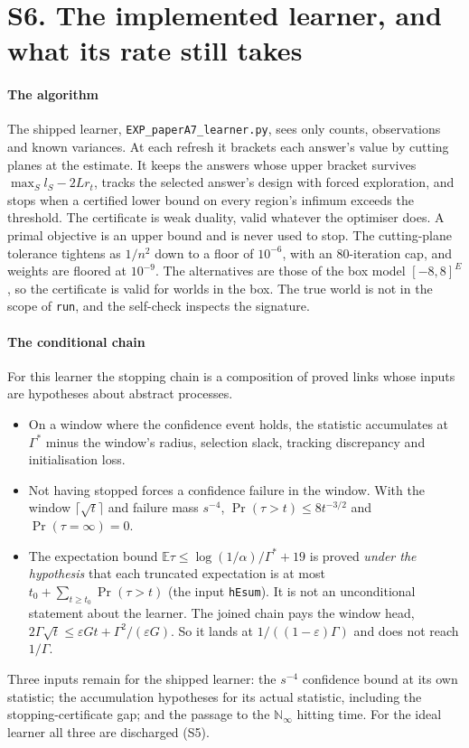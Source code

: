 
\section{S6. The implemented learner, and what its rate still takes}

\paragraph{The algorithm} The shipped learner, \texttt{EXP\_paperA7\_learner.py}, sees only
counts, observations and known variances. At each refresh it brackets each answer's value by
cutting planes at the estimate. It keeps the answers whose upper bracket survives
$\max_{S}l_{S}-2Lr_{t}$, tracks the selected answer's design with forced exploration, and stops
when a certified lower bound on every region's infimum exceeds the threshold. The certificate is
weak duality, valid whatever the optimiser does. A primal objective is an upper bound and is
never used to stop. The cutting-plane tolerance tightens as $1/n^{2}$ down to a floor of
$10^{-6}$, with an 80-iteration cap, and weights are floored at $10^{-9}$. The alternatives are
those of the box model $[-8,8]^E$, so the certificate is valid for worlds in the box. The true
world is not in the scope of \texttt{run}, and the
self-check inspects the signature.

\paragraph{The conditional chain} For this learner the stopping chain is a composition of proved
links whose inputs are hypotheses about abstract processes.
\begin{itemize}
\item On a window where the confidence event holds, the statistic accumulates at
$\Gamma^{*}$ minus the window's radius, selection slack, tracking discrepancy and
initialisation loss.
\item Not having stopped forces a confidence failure in the window. With the window
$\lceil\sqrt t\rceil$ and failure mass $s^{-4}$, $\Pr(\tau>t)\le8t^{-3/2}$ and
$\Pr(\tau=\infty)=0$.
\item The expectation bound $\mathbb{E}\tau\le\log(1/\alpha)/\Gamma^{*}+19$ is proved
\emph{under the hypothesis} that each truncated expectation is at most
$t_{0}+\sum_{t\ge t_{0}}\Pr(\tau>t)$ (the input \texttt{hEsum}). It is not an unconditional
statement about the learner. The joined chain pays the window head,
$2\Gamma\sqrt t\le\varepsilon Gt+\Gamma^{2}/(\varepsilon G)$. So it lands at
$1/((1-\varepsilon)\Gamma)$ and does not reach $1/\Gamma$.
\end{itemize}
Three inputs remain for the shipped learner: the $s^{-4}$ confidence bound at its own
statistic; the accumulation hypotheses for its actual statistic, including the
stopping-certificate gap; and the passage to the $\mathbb{N}_{\infty}$ hitting time. For the
ideal learner all three are discharged (S5).

